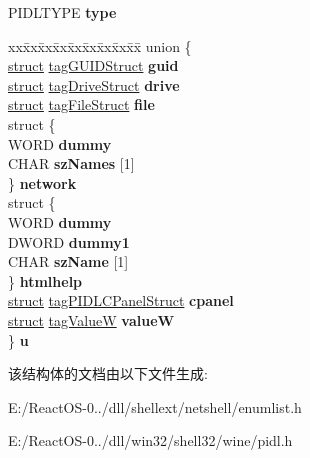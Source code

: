 \begin{DoxyCompactItemize}
\begin{tabbing}
\end{tabbing}\item 
\mbox{\label{structtag_p_i_d_l_d_a_t_a_a3011d25344e228a7bb3a0f7a5bf1f07b}} 
P\+I\+D\+L\+T\+Y\+PE {\bfseries type}
\item 
\mbox{\label{structtag_p_i_d_l_d_a_t_a_a590771f4d9b5ad537506c8315f0db2fc}} 
\begin{tabbing}
xx\=xx\=xx\=xx\=xx\=xx\=xx\=xx\=xx\=\kill
union \{\\
\>\hyperlink{interfacestruct}{struct} \hyperlink{structtag_g_u_i_d_struct}{tagGUIDStruct} {\bfseries guid}\\
\>\hyperlink{interfacestruct}{struct} \hyperlink{structtag_drive_struct}{tagDriveStruct} {\bfseries drive}\\
\>\hyperlink{interfacestruct}{struct} \hyperlink{structtag_file_struct}{tagFileStruct} {\bfseries file}\\
\>struct \{\\
\>\>WORD {\bfseries dummy}\\
\>\>CHAR {\bfseries szNames} \mbox{[}1\mbox{]}\\
\>\} {\bfseries network}\\
\>struct \{\\
\>\>WORD {\bfseries dummy}\\
\>\>DWORD {\bfseries dummy1}\\
\>\>CHAR {\bfseries szName} \mbox{[}1\mbox{]}\\
\>\} {\bfseries htmlhelp}\\
\>\hyperlink{interfacestruct}{struct} \hyperlink{structtag_p_i_d_l_c_panel_struct}{tagPIDLCPanelStruct} {\bfseries cpanel}\\
\>\hyperlink{interfacestruct}{struct} \hyperlink{structtag_value_w}{tagValueW} {\bfseries valueW}\\
\} {\bfseries u}\\

\end{tabbing}\end{DoxyCompactItemize}


该结构体的文档由以下文件生成\+:\begin{DoxyCompactItemize}
\item 
E\+:/\+React\+O\+S-\/0../dll/shellext/netshell/enumlist.\+h\item 
E\+:/\+React\+O\+S-\/0../dll/win32/shell32/wine/pidl.\+h\end{DoxyCompactItemize}
